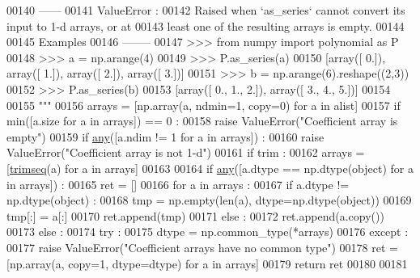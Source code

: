 \begin{DoxyCode}
00140 \textcolor{stringliteral}{    ------}
00141 \textcolor{stringliteral}{    ValueError :}
00142 \textcolor{stringliteral}{        Raised when `as\_series` cannot convert its input to 1-d arrays, or at}
00143 \textcolor{stringliteral}{        least one of the resulting arrays is empty.}
00144 \textcolor{stringliteral}{}
00145 \textcolor{stringliteral}{    Examples}
00146 \textcolor{stringliteral}{    --------}
00147 \textcolor{stringliteral}{    >>> from numpy import polynomial as P}
00148 \textcolor{stringliteral}{    >>> a = np.arange(4)}
00149 \textcolor{stringliteral}{    >>> P.as\_series(a)}
00150 \textcolor{stringliteral}{    [array([ 0.]), array([ 1.]), array([ 2.]), array([ 3.])]}
00151 \textcolor{stringliteral}{    >>> b = np.arange(6).reshape((2,3))}
00152 \textcolor{stringliteral}{    >>> P.as\_series(b)}
00153 \textcolor{stringliteral}{    [array([ 0.,  1.,  2.]), array([ 3.,  4.,  5.])]}
00154 \textcolor{stringliteral}{}
00155 \textcolor{stringliteral}{    """}
00156     arrays = [np.array(a, ndmin=1, copy=0) \textcolor{keywordflow}{for} a \textcolor{keywordflow}{in} alist]
00157     \textcolor{keywordflow}{if} min([a.size \textcolor{keywordflow}{for} a \textcolor{keywordflow}{in} arrays]) == 0 :
00158         \textcolor{keywordflow}{raise} ValueError(\textcolor{stringliteral}{"Coefficient array is empty"})
00159     \textcolor{keywordflow}{if} \hyperlink{namespacepyneb_1_1utils_1_1polyutils_a7a16ae5631115dce0a513eaec3a06470}{any}([a.ndim != 1 \textcolor{keywordflow}{for} a \textcolor{keywordflow}{in} arrays]) :
00160         \textcolor{keywordflow}{raise} ValueError(\textcolor{stringliteral}{"Coefficient array is not 1-d"})
00161     \textcolor{keywordflow}{if} trim :
00162         arrays = [\hyperlink{namespacepyneb_1_1utils_1_1polyutils_a2d09c123dbbcfd4623784cacf1fc945c}{trimseq}(a) \textcolor{keywordflow}{for} a \textcolor{keywordflow}{in} arrays]
00163 
00164     \textcolor{keywordflow}{if} \hyperlink{namespacepyneb_1_1utils_1_1polyutils_a7a16ae5631115dce0a513eaec3a06470}{any}([a.dtype == np.dtype(object) \textcolor{keywordflow}{for} a \textcolor{keywordflow}{in} arrays]) :
00165         ret = []
00166         \textcolor{keywordflow}{for} a \textcolor{keywordflow}{in} arrays :
00167             \textcolor{keywordflow}{if} a.dtype != np.dtype(object) :
00168                 tmp = np.empty(len(a), dtype=np.dtype(object))
00169                 tmp[:] = a[:]
00170                 ret.append(tmp)
00171             \textcolor{keywordflow}{else} :
00172                 ret.append(a.copy())
00173     \textcolor{keywordflow}{else} :
00174         \textcolor{keywordflow}{try} :
00175             dtype = np.common\_type(*arrays)
00176         \textcolor{keywordflow}{except} :
00177             \textcolor{keywordflow}{raise} ValueError(\textcolor{stringliteral}{"Coefficient arrays have no common type"})
00178         ret = [np.array(a, copy=1, dtype=dtype) \textcolor{keywordflow}{for} a \textcolor{keywordflow}{in} arrays]
00179     \textcolor{keywordflow}{return} ret
00180 
00181 
\end{DoxyCode}
\hypertarget{namespacepyneb_1_1utils_1_1polyutils_a3216f3b76273619e84e2e0e6c22dbf21}{}
